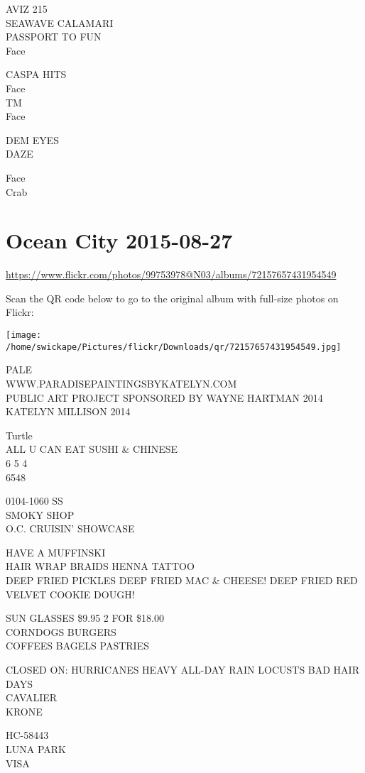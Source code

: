 \documentclass[10pt,letterpaper]{article}
\begin{document}
AVIZ 215\\
SEAWAVE CALAMARI\\
PASSPORT TO FUN\\
Face

CASPA HITS\\
Face\\
TM\\
Face

DEM EYES\\
DAZE

Face\\
Crab
\pagebreak

\section*{Ocean City 2015-08-27}

\url{https://www.flickr.com/photos/99753978@N03/albums/72157657431954549}

Scan the QR code below to go to the original album with full-size photos on Flickr:

\texttt{[image: /home/swickape/Pictures/flickr/Downloads/qr/72157657431954549.jpg]}
\pagebreak

PALE\\
WWW.PARADISEPAINTINGSBYKATELYN.COM\\
PUBLIC ART PROJECT SPONSORED BY WAYNE HARTMAN 2014\\
KATELYN MILLISON 2014

Turtle\\
ALL U CAN EAT SUSHI \& CHINESE\\
6 5 4\\
6548

0104{-}1060 SS\\
SMOKY SHOP\\
O.C. CRUISIN' SHOWCASE

HAVE A MUFFINSKI\\
HAIR WRAP BRAIDS HENNA TATTOO\\
DEEP FRIED PICKLES  DEEP FRIED MAC \& CHEESE!  DEEP FRIED RED VELVET COOKIE DOUGH!

SUN GLASSES \$9.95 2 FOR \$18.00\\
CORNDOGS BURGERS\\
COFFEES BAGELS PASTRIES

CLOSED ON: HURRICANES HEAVY ALL{-}DAY RAIN LOCUSTS BAD HAIR DAYS\\
CAVALIER\\
KRONE

HC{-}58443\\
LUNA PARK\\
VISA
\end{document}
